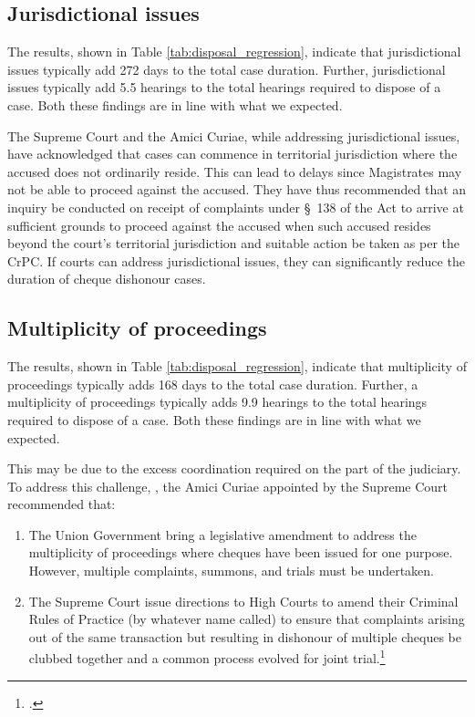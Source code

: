 \documentclass[12pt,a4paper]{article}
\begin{document}
\subsection{Jurisdictional issues}
\label{sec:jurisd-issu}

The results, shown in Table \ref{tab:disposal_regression}, indicate that jurisdictional issues typically add 272 days to the total case duration. Further, jurisdictional issues typically add 5.5 hearings to the total hearings required to dispose of a case. Both these findings are in line with what we expected.

The Supreme Court and the Amici Curiae, while addressing jurisdictional issues, have acknowledged that cases can commence in territorial jurisdiction where the accused does not ordinarily reside. This can lead to delays since Magistrates may not be able to proceed against the accused. They have thus recommended that an inquiry be conducted on receipt of complaints under \S~138 of the Act to arrive at sufficient grounds to proceed against the accused when such accused resides beyond the court's territorial jurisdiction and suitable action be taken as per the CrPC. If courts can address jurisdictional issues, they can significantly reduce the duration of cheque dishonour cases.

\subsection{Multiplicity of proceedings}
\label{sec:mult-proc}

The results, shown in Table \ref{tab:disposal_regression}, indicate that multiplicity of proceedings typically adds 168 days to the total case duration. Further, a multiplicity of proceedings typically adds 9.9 hearings to the total hearings required to dispose of a case. Both these findings are in line with what we expected.

This may be due to the excess coordination required on the part of the judiciary. To address this challenge, , the Amici Curiae appointed by the Supreme Court recommended that:

\begin{enumerate}
\item The Union Government bring a legislative amendment to address the multiplicity of proceedings where cheques have been issued for one purpose. However, multiple complaints, summons, and trials must be undertaken.
\item The Supreme Court issue directions to High Courts to amend their Criminal Rules of Practice (by whatever name called) to ensure that complaints arising out of the same transaction but resulting in dishonour of multiple cheques be clubbed together and a common process evolved for joint trial.\footcite{amicus2020_submission}
\end{enumerate}
\end{document}
